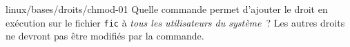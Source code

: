 \begin{question}{linux/bases/droits/chmod-01}
  Quelle commande permet d'ajouter le droit en exécution sur le
  fichier {\tt fic} à {\em tous les utilisateurs du système}~? Les
  autres droits ne devront pas être modifiés par la commande.
  \begin{reponses}
    \lastchoices
  \end{reponses}
\end{question}
